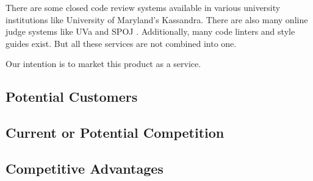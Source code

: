 
There are some closed code review systems available in various university
institutions like \cite{Matt1994} University of Maryland's Kassandra. There are also
many online judge systems like UVa \cite{UVA} and SPOJ \cite{SPOJ}. Additionally, many code linters and
style guides exist. But all these services are not combined into one.

Our intention is to market this product as a service.
\subsection{Potential Customers}
\subsection{Current or Potential Competition}
\subsection{Competitive Advantages}
